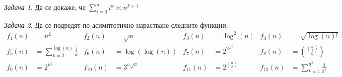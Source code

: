 \documentclass{article}
\theoremstyle{definition}
\theoremstyle{plain}
\theoremstyle{remark}
\newtheorem{problem}{Задача}
\theoremstyle{definition}
\begin{document}
\begin{problem}
  Да се докаже, че $\sum\limits_{i = 0}^n i^k \asymp n^{k+1}$
\end{problem}

\begin{problem}
  Да се подредят по асимптотично нарастване следните функции:
  \begin{align*}
    f_1(n) &= n^2 &f_2(n) &= \sqrt{n} &f_3(n) &= \log^2(n) &f_4(n) &= \sqrt{\log(n)!} \\
    f_5(n) &= \sum\limits_{k = 2}^{\log(n)} \frac{1}{k} &f_6(n) &= \log(\log(n)) &f_7(n) &= 2^{2^{\sqrt{n}}} &f_8(n) &= \binom{\binom{n}{3}}{2} \\
    f_9(n) &=2^{n^2} &f_{10}(n) &= 3^{n \sqrt{n}} &f_{11}(n) &=2^{\binom{n}{2}} &f_{12}(n) &= \sum\limits_{k = 1}^{n^2} \frac{1}{2^k}
  \end{align*}
\end{problem}
\end{document}
